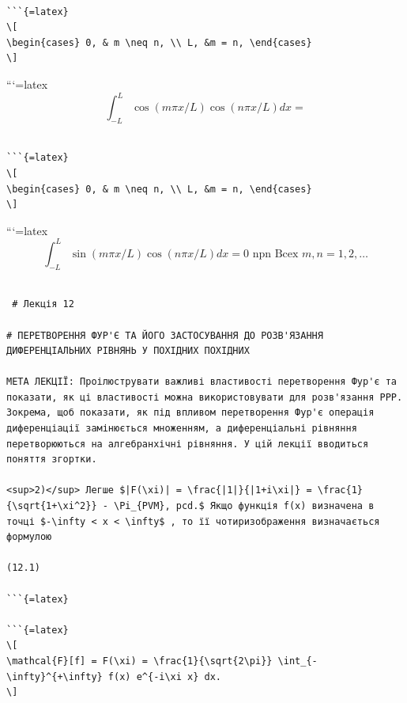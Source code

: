 \documentclass[
  ukrainian,
]{article}
\begin{document}
\begin{verbatim}

```{=latex}
\[
\begin{cases} 0, & m \neq n, \\ L, &m = n, \end{cases}
\]
\end{verbatim}

```{=latex}
\[
\int_{-L}^{L} \cos(m\pi x/L) \cos(n\pi x/L) dx =
\]

\begin{verbatim}

```{=latex}
\[
\begin{cases} 0, & m \neq n, \\ L, &m = n, \end{cases}
\]
\end{verbatim}

```{=latex}
\[
\int_{-L}^{L} \sin(m\pi x/L) \cos(n\pi x/L) dx = 0 \text{ npn Bcex } m, n = 1, 2, \dots
\]

\begin{verbatim}

 # Лекція 12

# ПЕРЕТВОРЕННЯ ФУР'Є ТА ЙОГО ЗАСТОСУВАННЯ ДО РОЗВ'ЯЗАННЯ ДИФЕРЕНЦІАЛЬНИХ РІВНЯНЬ У ПОХІДНИХ ПОХІДНИХ

МЕТА ЛЕКЦІЇ: Проілюструвати важливі властивості перетворення Фур'є та показати, як ці властивості можна використовувати для розв'язання PPP. Зокрема, щоб показати, як під впливом перетворення Фур'є операція диференціації замінюється множенням, а диференціальні рівняння перетворюються на алгебранхічні рівняння. У цій лекції вводиться поняття згортки.

<sup>2)</sup> Легше $|F(\xi)| = \frac{|1|}{|1+i\xi|} = \frac{1}{\sqrt{1+\xi^2}} - \Pi_{PVM}, pcd.$ Якщо функція f(x) визначена в точці $-\infty < x < \infty$ , то її чотиризображення визначається формулою

(12.1)

```{=latex}

```{=latex}
\[
\mathcal{F}[f] = F(\xi) = \frac{1}{\sqrt{2\pi}} \int_{-\infty}^{+\infty} f(x) e^{-i\xi x} dx.
\]
\end{verbatim}
\end{document}
